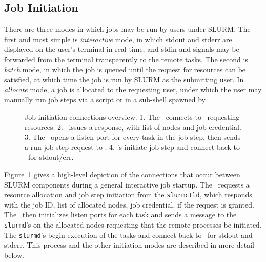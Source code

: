 
\subsection{Job Initiation}

There are three modes in which jobs may be run by users under SLURM. The
first and most simple is {\em interactive} mode, in which stdout and
stderr are displayed on the user's terminal in real time, and stdin and
signals may be forwarded from the  terminal transparently to the remote
tasks. The second is {\em batch} mode, in which the job is
queued until the request for resources can be satisfied, at which time the
job is run by SLURM as the submitting user. In {\em allocate} mode,
a job is allocated to the requesting user, under which the user may
manually run job steps via a script or in a sub-shell spawned by \srun .

\begin{figure}[tb]
\centerline{}
\caption{\small Job initiation connections overview. 1. The \srun\ connects to
         \slurmctld\ requesting resources. 2. \slurmctld\ issues a response,
         with list of nodes and job credential. 3. The \srun\ opens a listen
         port for every task in the job step, then sends a run job step
         request to \slurmd . 4. \slurmd 's initiate job step and connect
         back to \srun\ for stdout/err. }
\label{connections}
\end{figure}

Figure~\ref{connections} gives a high-level depiction of the connections
that occur between SLURM components during a general interactive job
startup.
The \srun\ requests a resource allocation and job step initiation from the {\tt slurmctld},
which responds with the job ID, list of allocated nodes, job credential.
if the request is granted.
The \srun\ then initializes listen ports for each
task and sends a message to the {\tt slurmd}'s on the allocated nodes requesting
that the remote processes be initiated. The {\tt slurmd}'s begin execution of
the tasks and connect back to \srun\ for stdout and stderr. This process and
the other initiation modes are described in more detail below.

